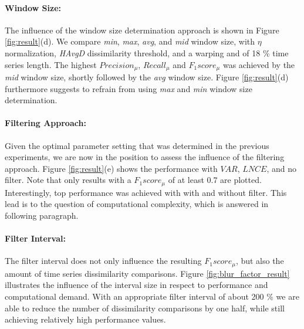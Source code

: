 \paragraph{Window Size:}

The influence of the window size determination approach is shown in Figure \ref{fig:result}(d). We compare \textit{min}, \textit{max}, \textit{avg}, and \textit{mid} window size, with $\eta$ normalization, \textit{HAvgD} dissimilarity threshold, and a warping and of 18 \% time series length. The highest $Precision_{\mu}$, $Recall_{\mu}$ and $F_{1}score_{\mu}$ was achieved by the \textit{mid} window size, shortly followed by the \textit{avg} window size. Figure \ref{fig:result}(d) furthermore suggests to refrain from using \textit{max} and \textit{min} window size determination.


\paragraph{Filtering Approach:}

Given the optimal parameter setting that was determined in the previous experiments, we are now in the position to assess the influence of the filtering approach. Figure \ref{fig:result}(e) shows the performance with $VAR$, $LNCE$, and no filter. Note that only results with a
$F_{1}score_{\mu}$ of at least 0.7 are plotted. Interestingly, top performance was achieved with with and without filter. This lead is to the question of computational complexity, which is answered in following paragraph.

\paragraph{Filter Interval:}

The filter interval does not only influence the resulting $F_{1}score_{\mu}$, but also the amount of time series dissimilarity comparisons.
Figure \ref{fig:blur_factor_result} illustrates the influence of the interval size in respect to performance and computational demand.
With an appropriate filter interval of about 200 \% we are able to reduce the number of dissimilarity comparisons by one half, while still achieving relatively high performance values.

